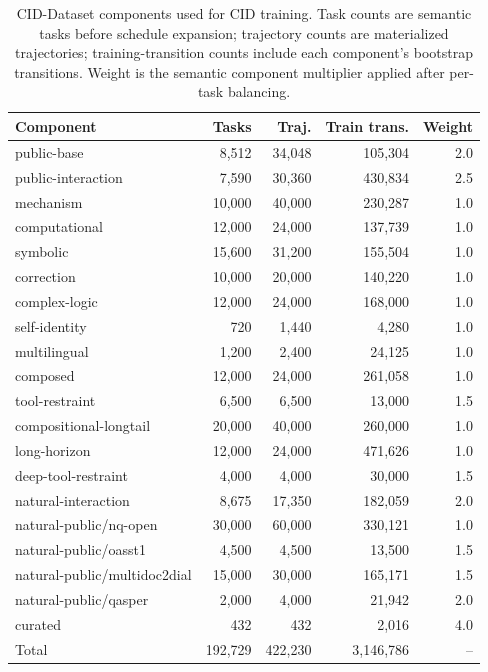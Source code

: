 \begin{table}[t]
  \centering
  \scriptsize
  \begin{tabular}{lrrrr}
    \toprule
    Component & Tasks & Traj. & Train trans. & Weight \\
    \midrule
    public-base & 8,512 & 34,048 & 105,304 & 2.0 \\
    public-interaction & 7,590 & 30,360 & 430,834 & 2.5 \\
    mechanism & 10,000 & 40,000 & 230,287 & 1.0 \\
    computational & 12,000 & 24,000 & 137,739 & 1.0 \\
    symbolic & 15,600 & 31,200 & 155,504 & 1.0 \\
    correction & 10,000 & 20,000 & 140,220 & 1.0 \\
    complex-logic & 12,000 & 24,000 & 168,000 & 1.0 \\
    self-identity & 720 & 1,440 & 4,280 & 1.0 \\
    multilingual & 1,200 & 2,400 & 24,125 & 1.0 \\
    composed & 12,000 & 24,000 & 261,058 & 1.0 \\
    tool-restraint & 6,500 & 6,500 & 13,000 & 1.5 \\
    compositional-longtail & 20,000 & 40,000 & 260,000 & 1.0 \\
    long-horizon & 12,000 & 24,000 & 471,626 & 1.0 \\
    deep-tool-restraint & 4,000 & 4,000 & 30,000 & 1.5 \\
    natural-interaction & 8,675 & 17,350 & 182,059 & 2.0 \\
    natural-public/nq-open & 30,000 & 60,000 & 330,121 & 1.0 \\
    natural-public/oasst1 & 4,500 & 4,500 & 13,500 & 1.5 \\
    natural-public/multidoc2dial & 15,000 & 30,000 & 165,171 & 1.5 \\
    natural-public/qasper & 2,000 & 4,000 & 21,942 & 2.0 \\
    curated & 432 & 432 & 2,016 & 4.0 \\
    \midrule
    Total & 192,729 & 422,230 & 3,146,786 & -- \\
    \bottomrule
  \end{tabular}
  \caption{CID-Dataset components used for CID training. Task counts are semantic tasks before schedule expansion; trajectory counts are materialized trajectories; training-transition counts include each component's bootstrap transitions. Weight is the semantic component multiplier applied after per-task balancing.}
  \label{tab:dataset-components}
\end{table}

